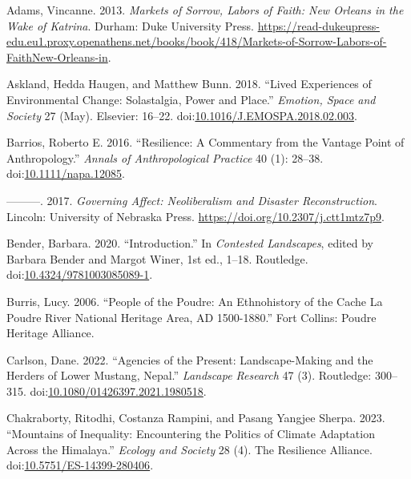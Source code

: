 \documentclass[
]{article}
\newlength{\cslhangindent}
\newenvironment{CSLReferences}[2] %
 {\begin{list}{}{%
  \setlength{\itemindent}{0pt}
  \setlength{\leftmargin}{0pt}
  \setlength{\parsep}{0pt}
  \ifodd #1
   \setlength{\leftmargin}{\cslhangindent}
   \setlength{\itemindent}{-1\cslhangindent}
  \fi
  \setlength{\itemsep}{#2\baselineskip}}}
 {\end{list}}
\begin{document}
\label{refs}
\begin{CSLReferences}{1}{0}
Adams, Vincanne. 2013. \emph{Markets of {Sorrow}, {Labors} of {Faith}: {New Orleans} in the {Wake} of {Katrina}}. Durham: Duke University Press. \url{https://read-dukeupress-edu.eu1.proxy.openathens.net/books/book/418/Markets-of-Sorrow-Labors-of-FaithNew-Orleans-in}.

Askland, Hedda Haugen, and Matthew Bunn. 2018. {``Lived Experiences of Environmental Change: {Solastalgia}, Power and Place.''} \emph{Emotion, Space and Society} 27 (May). Elsevier: 16--22. doi:\href{https://doi.org/10.1016/J.EMOSPA.2018.02.003}{10.1016/J.EMOSPA.2018.02.003}.

Barrios, Roberto E. 2016. {``Resilience: {A} Commentary from the Vantage Point of Anthropology.''} \emph{Annals of Anthropological Practice} 40 (1): 28--38. doi:\href{https://doi.org/10.1111/napa.12085}{10.1111/napa.12085}.

---------. 2017. \emph{Governing {Affect}: {Neoliberalism} and {Disaster Reconstruction}}. Lincoln: University of Nebraska Press. \url{https://doi.org/10.2307/j.ctt1mtz7p9}.

Bender, Barbara. 2020. {``Introduction.''} In \emph{Contested {Landscapes}}, edited by Barbara Bender and Margot Winer, 1st ed., 1--18. Routledge. doi:\href{https://doi.org/10.4324/9781003085089-1}{10.4324/9781003085089-1}.

Burris, Lucy. 2006. {``People of the {Poudre}: {An Ethnohistory} of the {Cache} La {Poudre River National Heritage Area}, {AD} 1500-1880.''} Fort Collins: Poudre Heritage Alliance.

Carlson, Dane. 2022. {``Agencies of the Present: Landscape-Making and the Herders of Lower {Mustang}, {Nepal}.''} \emph{Landscape Research} 47 (3). Routledge: 300--315. doi:\href{https://doi.org/10.1080/01426397.2021.1980518}{10.1080/01426397.2021.1980518}.

Chakraborty, Ritodhi, Costanza Rampini, and Pasang Yangjee Sherpa. 2023. {``Mountains of Inequality: Encountering the Politics of Climate Adaptation Across the {Himalaya}.''} \emph{Ecology and Society} 28 (4). The Resilience Alliance. doi:\href{https://doi.org/10.5751/ES-14399-280406}{10.5751/ES-14399-280406}.


\end{CSLReferences}
\end{document}
